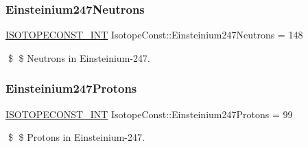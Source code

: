 \subsubsection{\texorpdfstring{Einsteinium247\+Neutrons}{Einsteinium247Neutrons}}
{\footnotesize\ttfamily \mbox{\hyperlink{group___isotope_const-_macros_ga5f18360b3e99483a35c32d789e62621c}{I\+S\+O\+T\+O\+P\+E\+C\+O\+N\+S\+T\+\_\+\+I\+NT}} Isotope\+Const\+::\+Einsteinium247\+Neutrons = 148}

\$ \$ Neutrons in Einsteinium-\/247. \mbox{\label{group___isotope_const-_einsteinium-_es247_ga9a24452b7f0504983211a9c3bdc79c00}} 
\subsubsection{\texorpdfstring{Einsteinium247\+Protons}{Einsteinium247Protons}}
{\footnotesize\ttfamily \mbox{\hyperlink{group___isotope_const-_macros_ga5f18360b3e99483a35c32d789e62621c}{I\+S\+O\+T\+O\+P\+E\+C\+O\+N\+S\+T\+\_\+\+I\+NT}} Isotope\+Const\+::\+Einsteinium247\+Protons = 99}

\$ \$ Protons in Einsteinium-\/247. 